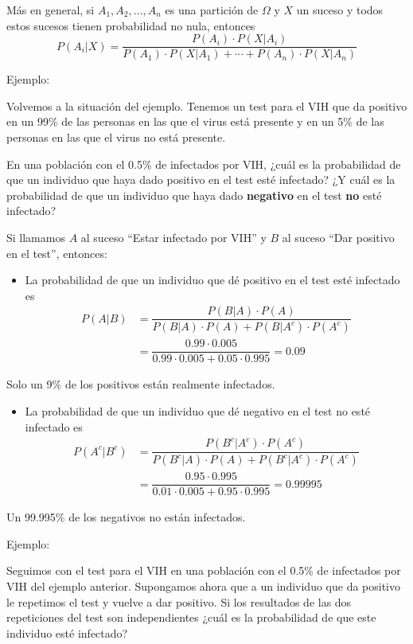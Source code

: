 \documentclass[
  spanish,
  letterpaper,
  DIV=11,
  numbers=noendperiod]{scrreprt}
\providecommand{\tightlist}{%
  \setlength{\itemsep}{0pt}\setlength{\parskip}{0pt}}
\begin{document}
\begin{tcolorbox}
Más en general, si \(A_1,A_2,\ldots,A_n\) es una partición de \(\Omega\)
y \(X\) un suceso y todos estos sucesos tienen probabilidad no nula,
entonces \[
P(A_i|X) =\dfrac{P(A_i)\cdot P(X|A_i)}{P(A_1)\cdot P(X|A_1)+\cdots+P(A_n)\cdot P(X|A_n)}
\]

Ejemplo:

Volvemos a la situación del ejemplo. Tenemos un test para el VIH que da
positivo en un 99\% de las personas en las que el virus está presente y
en un 5\% de las personas en las que el virus no está presente.

En una población con el 0.5\% de infectados por VIH, ¿cuál es la
probabilidad de que un individuo que haya dado positivo en el test esté
infectado? ¿Y cuál es la probabilidad de que un individuo que haya dado
\textbf{negativo} en el test \textbf{no} esté infectado?

Si llamamos \(A\) al suceso ``Estar infectado por VIH'' y \(B\) al
suceso ``Dar positivo en el test'', entonces:

\begin{itemize}
\tightlist
\item
  La probabilidad de que un individuo que dé positivo en el test esté
  infectado es \[
  \begin{array}{rl}
  P(A|B)\!\!\!\! & =\dfrac{P(B|A)\cdot P(A)}{P(B|A)\cdot P(A)+P(B|A^c)\cdot P(A^c)}\\
  &=\dfrac{0.99\cdot 0.005}{0.99\cdot 0.005+0.05\cdot 0.995}=0.09
  \end{array}
  \]
\end{itemize}

Solo un 9\% de los positivos están realmente infectados.

\begin{itemize}
\tightlist
\item
  La probabilidad de que un individuo que dé negativo en el test no esté
  infectado es \[
  \begin{array}{rl} 
  P(A^c|B^c)\!\!\!\!& =\dfrac{P(B^c|A^c)\cdot P(A^c)}{P(B^c|A)\cdot P(A)+P(B^c|A^c)\cdot P(A^c)}\\
  & =\dfrac{0.95\cdot 0.995}{0.01\cdot 0.005+0.95\cdot 0.995}=0.99995
  \end{array}
  \]
\end{itemize}

Un 99.995\% de los negativos no están infectados.

Ejemplo:

Seguimos con el test para el VIH en una población con el 0.5\% de
infectados por VIH del ejemplo anterior. Supongamos ahora que a un
individuo que da positivo le repetimos el test y vuelve a dar positivo.
Si los resultados de las dos repeticiones del test son independientes
¿cuál es la probabilidad de que este individuo esté infectado?


\end{tcolorbox}
\end{document}
